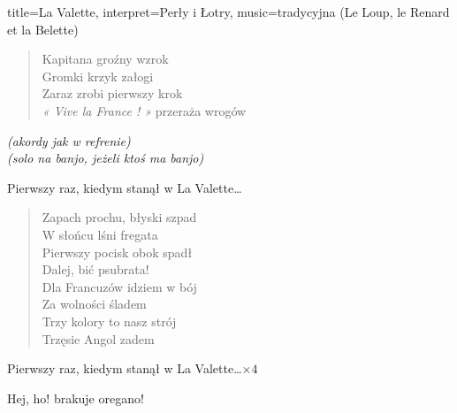 \begin{song}{title={La Valette}, interpret={Perły i Łotry}, music={tradycyjna (Le Loup, le Renard et la Belette)}}
\begin{multicols}{2}
\begin{verse}
        Kapitana groźny wzrok \\
        Gromki krzyk załogi \\
        Zaraz zrobi pierwszy krok \\
        \textit{« Vive la France ! »} przeraża wrogów
    \end{verse}
    \begin{interlude}
        \textit{(akordy jak w refrenie)} \\
        \textit{(solo na banjo, jeżeli ktoś ma banjo)}
    \end{interlude}
    \begin{chorus}
        Pierwszy raz, kiedym stanął w La Valette\ldots
    \end{chorus}
    \begin{verse}
        Zapach prochu, błyski szpad \\
        W słońcu lśni fregata \\
        Pierwszy pocisk obok spadł \\
        Dalej, bić psubrata! \smallskip \\
        Dla Francuzów idziem w bój \\
        Za wolności śladem \\
        Trzy kolory to nasz strój \\
        Trzęsie Angol zadem
    \end{verse}
    \begin{chorus}
        Pierwszy raz, kiedym stanął w La Valette\ldots $\times 4$
    \end{chorus}
    \begin{outro}
        Hej, ho! brakuje oregano! \\
          
    \end{outro}
    \vfill\null
    \end{multicols}
\end{song}

